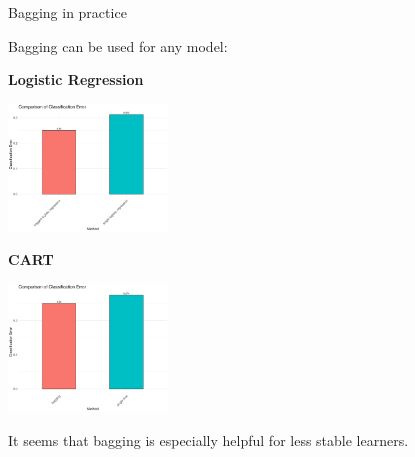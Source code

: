 \documentclass[11pt,compress,t,notes=noshow, xcolor=table]{beamer}
\begin{document}
\begin{vbframe}{Bagging in practice}

Bagging can be used for any model:

\vspace{2em}

\begin{minipage}{0.4\textwidth}
\begin{center}
\textbf{Logistic Regression}
\end{center}

\includegraphics[width=120pt]{figure/bagging-bench_log.jpg}
\end{minipage}
\begin{minipage}{0.4\textwidth}
\begin{center}
\textbf{CART}
\end{center}

\includegraphics[width=120pt]{figure/bagging-bench_tree.jpg}
\end{minipage}

It seems that bagging is especially helpful for less stable learners.

\end{vbframe}
\end{document}
